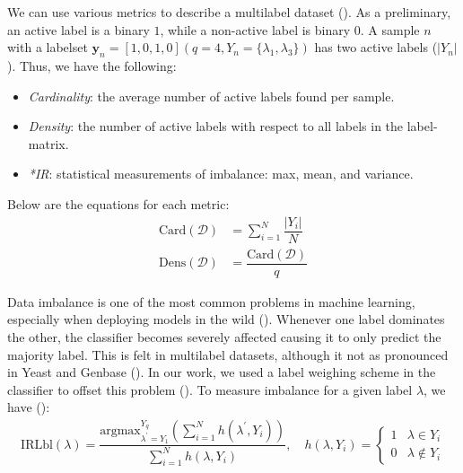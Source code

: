 \par We can use various metrics to describe a multilabel dataset
(\cite{charte2015imbalance}). As a preliminary, an active label is a binary
$1$, while a non-active label is binary $0$. A sample $n$ with a labelset
$\mathbf{y}_n = \left[1,0,1,0\right] (q=4, Y_n = \{\lambda_1, \lambda_3\})$ has
two active labels ($|Y_n|$). Thus, we have the following:
\begin{itemize}
    \item \textit{Cardinality}: the average number of active labels found per
        sample.
    \item \textit{Density}: the number of active labels with respect to all
        labels in the label-matrix.
    \item \textit{*IR}: statistical measurements of imbalance: max, mean, and
        variance.
\end{itemize}

\par Below are the equations for each metric:
\begin{align}
    \text{Card}(\mathcal{D}) &= \sum_{i=1}^{N}
    \dfrac{|{Y}_{i}|}{N} \\
    \text{Dens}(\mathcal{D}) &=
    \dfrac{\text{Card}(\mathcal{D})}{q} 
\end{align}

\par Data imbalance is one of the most common problems in machine learning,
especially when deploying models in the wild (\cite{he2009learning}). Whenever
one label dominates the other, the classifier becomes severely affected causing
it to only predict the majority label. This is felt in multilabel datasets,
although it not as pronounced in Yeast and Genbase (\cite{
charte2015imbalance}).  In our work, we used a label weighing scheme in the
classifier to offset this problem (\cite{pedregosa2011scikit,
chang2011libsvm}). To measure imbalance for a given label $\lambda$, we have
(\cite{charte2015imbalance}):
\begin{align}
    \text{IRLbl}(\lambda) =
    \dfrac{
        \text{argmax}_{\lambda^{\prime}=Y_1}^{Y_q}
        (\sum_{i=1}^{N} h(\lambda^{\prime},Y_i))
    }{
        \sum_{i=1}^{N} h(\lambda,Y_i)
    }, \quad h(\lambda, Y_i) =
    \begin{cases}
        1 & \lambda \in Y_i \\
        0 & \lambda \notin Y_i
    \end{cases} 
\end{align}

